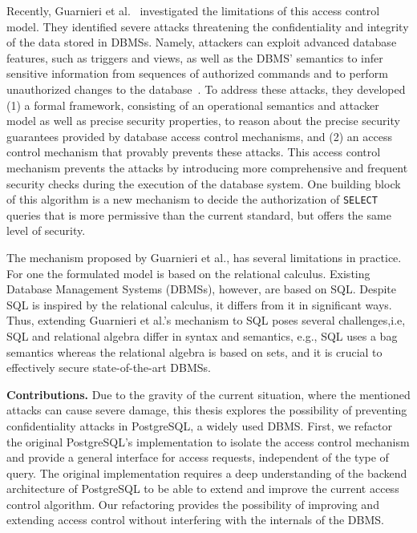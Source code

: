 %
Recently, Guarnieri et al.~\cite{guarnieri2016strong} investigated the limitations of this access control model. 
%
They identified severe attacks threatening the confidentiality and integrity of the data stored in DBMSs. 
%
Namely, attackers can exploit advanced database features, such as triggers and views, as well as the DBMS' semantics to infer sensitive information from sequences of authorized commands and to perform unauthorized changes to the database~\cite{guarnieri2016strong}.
% 
To address these attacks, they developed 
%
(1) a formal framework, consisting of an operational semantics and attacker model as well as precise security properties, to reason about the precise security guarantees provided by database access control mechanisms, and 
%
(2) an access control mechanism that provably prevents these attacks.
%
This access control mechanism prevents the attacks by introducing more comprehensive and frequent security checks during the execution of the database system.
%
One building block of this algorithm is a new mechanism to decide the authorization of \texttt{SELECT} queries that is more permissive than the current standard, but offers the same level of security.

The mechanism proposed by Guarnieri et al., has several limitations in practice.
%
For one the formulated model is based on the relational calculus. 
%
Existing Database Management Systems (DBMSs), however, are based on SQL.
%
Despite SQL is inspired by the relational calculus, it differs from it in significant ways.
%
Thus, extending Guarnieri et al.'s mechanism to SQL poses several challenges,i.e, SQL and relational algebra differ in syntax and semantics, e.g., SQL uses a bag semantics whereas the relational algebra is based on sets, and it is crucial to effectively secure state-of-the-art DBMSs.








\smallskip
\noindent
{\bf Contributions.}
%
Due to the gravity of the current situation, where the mentioned attacks can cause severe damage, this thesis explores the possibility of preventing confidentiality attacks in PostgreSQL, a widely used DBMS.
%
First, we refactor the original PostgreSQL's implementation to isolate the access control mechanism and provide a general interface for access requests, independent of the type of query.
%
The original implementation requires a deep understanding of the backend architecture of PostgreSQL to be able to extend and improve the current access control algorithm.
%
Our refactoring provides the possibility of improving and extending access control without interfering with the internals of the DBMS.

